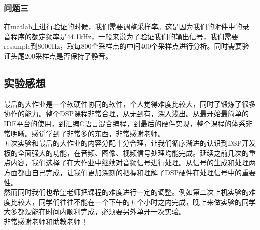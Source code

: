 \documentclass{article}
\begin{document}
\begin{CJK}{UTF8}{gbsn}
\subsubsection{问题三}
在matlab上进行验证的时候，我们需要调整采样率。这是因为我们的附件中的录音程序的额定频率是44.1kHz，一般来说为了验证我们的输出信号，我们需要resample到8000Hz，取每800个采样点的中间400个采样点进行分析。同时需要验证头尾200采样点是否保持了静音。
\subsection{实验感想}
最后的大作业是一个软硬件协同的软件，个人觉得难度比较大，同时了锻炼了很多协作的能力。整个DSP课程非常合理，从无到有，深入浅出。从最开始最简单的IDE平台的使用，到汇编C语言混合编程，到最后的硬件实现，整个课程的体系非常明晰。感觉学到了非常多的东西，非常感谢老师。\\
五次实验和最后的大作业的内容分配十分合理，让我们循序渐进的认识到DSP开发板的全面强大的功能，在音频、图像、视频信号处理均能完成。延续之前几次的重点内容，我们选择了在大作业中继续对音频信号进行处理。从信号的生成和处理两方面都由自己完成，让我们更加深刻的把握和理解了DSP硬件在处理信号中的重要性。\\
然而同时我们也希望老师把课程的难度进行一定的调整。例如第二次上机实验的难度比较大，同学们往往不能在一个下午的五个小时之内完成，晚上来做实验的同学大多都没能在时间内顺利完成，必须要另外单开一次实验。\\
非常感谢老师和助教老师！
\end{CJK}
\end{document}
